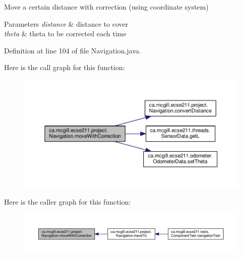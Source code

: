 Move a certain distance with correction (using coordinate system) 
\begin{DoxyParams}{Parameters}
{\em distance} & distance to cover \\
\hline
{\em theta} & theta to be corrected each time \\
\hline
\end{DoxyParams}


Definition at line 104 of file Navigation.\+java.

Here is the call graph for this function\+:
\nopagebreak
\begin{figure}[H]
\begin{center}
\leavevmode
\includegraphics[width=350pt]{classca_1_1mcgill_1_1ecse211_1_1project_1_1_navigation_a48eeb9ae2da23664421e8da5642054c7_cgraph}
\end{center}
\end{figure}
Here is the caller graph for this function\+:
\nopagebreak
\begin{figure}[H]
\begin{center}
\leavevmode
\includegraphics[width=350pt]{classca_1_1mcgill_1_1ecse211_1_1project_1_1_navigation_a48eeb9ae2da23664421e8da5642054c7_icgraph}
\end{center}
\end{figure}
\mbox{\label{classca_1_1mcgill_1_1ecse211_1_1project_1_1_navigation_af2bddd9a34ea26cfd9a1e4ac055644dc}} 
